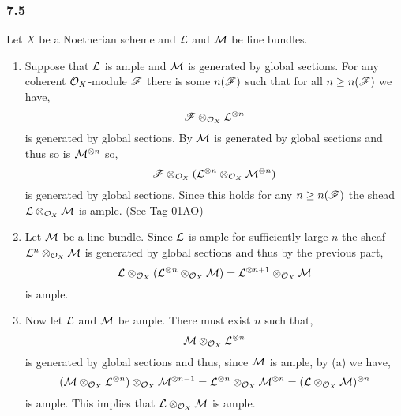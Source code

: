 \documentclass[12pt]{article}
\begin{document}
\subsubsection{7.5}


Let $X$ be a Noetherian scheme and $\mathcal{L}$ and $\mathcal{M}$ be line bundles.

\begin{enumerate}
\item Suppose that $\mathcal{L}$ is ample and $\mathcal{M}$ is generated by global sections. For any coherent $\mathcal{O}_{X}$-module $\mathscr{F}$ there is some $n(\mathscr{F})$ such that for all $n \ge n(\mathscr{F})$ we have,
\[ \mathscr{F} \otimes_{\mathcal{O}_{X}} \mathcal{L}^{\otimes n} \]
is generated by global sections. By $\mathcal{M}$ is generated by global sections and thus so is $\mathcal{M}^{\otimes n}$ so,
\[  \mathscr{F} \otimes_{\mathcal{O}_{X}} (\mathcal{L}^{\otimes n} \otimes_{\mathcal{O}_{X}} \mathcal{M}^{\otimes n}) \]
is generated by global sections. Since this holds for any $n \ge n(\mathscr{F})$ the shead $\mathcal{L} \otimes_{\mathcal{O}_{X}} \mathcal{M}$ is ample. (See Tag 01AO)

\item Let $\mathcal{M}$ be a line bundle. Since $\mathcal{L}$ is ample for sufficiently large $n$ the sheaf $\mathcal{L}^n \otimes_{\mathcal{O}_{X}} \mathcal{M}$ is generated by global sections and thus by the previous part,
\[ \mathcal{L} \otimes_{\mathcal{O}_{X}} (\mathcal{L}^{\otimes n} \otimes_{\mathcal{O}_{X}} \mathcal{M}) = \mathcal{L}^{\otimes n+1} \otimes_{\mathcal{O}_{X}} \mathcal{M} \]
is ample.
\item Now let $\mathcal{L}$ and $\mathcal{M}$ be ample. There must exist $n$ such that,
\[ \mathcal{M} \otimes_{\mathcal{O}_{X}} \mathcal{L}^{\otimes n} \]
is generated by global sections and thus, since $\mathcal{M}$ is ample, by (a) we have,
\[ (\mathcal{M} \otimes_{\mathcal{O}_{X}} \mathcal{L}^{\otimes n}) \otimes_{\mathcal{O}_{X}} \mathcal{M}^{\otimes n - 1} =  \mathcal{L}^{\otimes n} \otimes_{\mathcal{O}_{X}} \mathcal{M}^{\otimes n} = (\mathcal{L} \otimes_{\mathcal{O}_{X}} \mathcal{M})^{\otimes n} \]
is ample. This implies that $\mathcal{L} \otimes_{\mathcal{O}_{X}} \mathcal{M}$ is ample. 


\end{enumerate}
\end{document}
